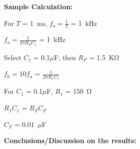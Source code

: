 \documentclass[9pt]{scrreprt}
\begin{document}
\textbf{Sample Calculation:}\\
\par
For $T$ = 1~ms, $f_a = \frac{1}{T}$ = 1~kHz\\
\par
$f_a = \frac{1}{2\pi R_F C_1}$ = 1~kHz\\
\par
Select $C_1$ = 0.1$\mu$F, then $R_F$ = 1.5~K$\si{\ohm}$\\
\par
$f_b$ = 10$f_a$ = $\frac{1}{2\pi R_1 C_1}$\\
\par
For $C_1$ = 0.1$\mu$F, $R_1$ = 150~$\si{\ohm}$\\
\par
$R_1 C_1$ = $R_F C_F$\\
\par
$C_F$ = 0.01~$\mu$F
\\
\par
\textbf{Conclusions/Discussion on the results:}
\end{document}
